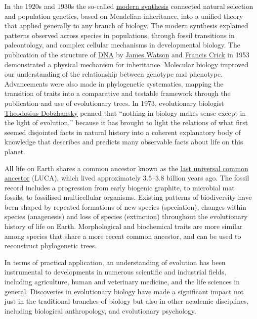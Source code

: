 In the 1920s and 1930s the so-called \href{https://en.wikipedia.org/wiki/Modern_synthesis_(20th_century)}{modern synthesis} connected natural selection and population genetics, based on Mendelian inheritance, into a unified theory that applied generally to any branch of biology. The modern synthesis explained patterns observed across species in populations, through fossil transitions in paleontology, and complex cellular mechanisms in developmental biology. The publication of the structure of \href{https://en.wikipedia.org/wiki/DNA}{DNA} by \href{https://en.wikipedia.org/wiki/James_Watson}{James Watson} and \href{https://en.wikipedia.org/wiki/Francis_Crick}{Francis Crick} in 1953 demonstrated a physical mechanism for inheritance. Molecular biology improved our understanding of the relationship between genotype and phenotype. Advancements were also made in phylogenetic systematics, mapping the transition of traits into a comparative and testable framework through the publication and use of evolutionary trees. In 1973, evolutionary biologist \href{https://en.wikipedia.org/wiki/Theodosius_Dobzhansky}{Theodosius Dobzhansky} penned that ``nothing in biology makes sense except in the light of evolution,'' because it has brought to light the relations of what first seemed disjointed facts in natural history into a coherent explanatory body of knowledge that describes and predicts many observable facts about life on this planet.

All life on Earth shares a common ancestor known as the \href{https://en.wikipedia.org/wiki/Last_universal_common_ancestor}{last universal common ancestor} (LUCA), which lived approximately 3.5--3.8 billion years ago. The fossil record includes a progression from early biogenic graphite, to microbial mat fossils, to fossilised multicellular organisms. Existing patterns of biodiversity have been shaped by repeated formations of new species (speciation), changes within species (anagenesis) and loss of species (extinction) throughout the evolutionary history of life on Earth. Morphological and biochemical traits are more similar among species that share a more recent common ancestor, and can be used to reconstruct phylogenetic trees.

In terms of practical application, an understanding of evolution has been instrumental to developments in numerous scientific and industrial fields, including agriculture, human and veterinary medicine, and the life sciences in general. Discoveries in evolutionary biology have made a significant impact not just in the traditional branches of biology but also in other academic disciplines, including biological anthropology, and evolutionary psychology.

